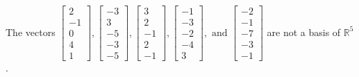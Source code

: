 \begin{exercise}
\begin{exerciseStatement}
  \end{exerciseStatement}
  \begin{exerciseAnswer}
   The vectors \(\left[\begin{array}{r}
2 \\
-1 \\
0 \\
4 \\
1
\end{array}\right] , \left[\begin{array}{r}
-3 \\
3 \\
-5 \\
-3 \\
-5
\end{array}\right] , \left[\begin{array}{r}
3 \\
2 \\
-1 \\
2 \\
-1
\end{array}\right] , \left[\begin{array}{r}
-1 \\
-3 \\
-2 \\
-4 \\
3
\end{array}\right] , \text{ and } \left[\begin{array}{r}
-2 \\
-1 \\
-7 \\
-3 \\
-1
\end{array}\right]\) 
  	 are not  a basis of \(\mathbb{R}^5\).
  


  \end{exerciseAnswer}
\end{exercise}